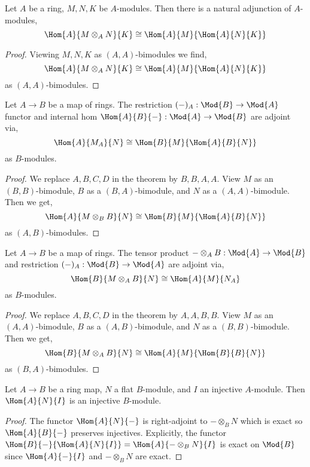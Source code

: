 \documentclass[12pt]{article}
\begin{document}
\begin{cor}
Let $A$ be a ring, $M, N, K$ be $A$-modules. Then there is a natural adjunction of $A$-modules,
\[ \Hom{A}{M \otimes_A N}{K} \cong \Hom{A}{M}{\Hom{A}{N}{K}} \]
\end{cor}

\begin{proof}
Viewing $M, N, K$ as $(A, A)$-bimodules we find,
\[ \Hom{A}{M \otimes_A N}{K} \cong \Hom{A}{M}{\Hom{A}{N}{K}} \]
as $(A,A)$-bimodules.
\end{proof}

\begin{cor}
Let $A \to B$ be a map of rings. The restriction $(-)_A : \Mod{B} \to \Mod{A}$ functor and internal hom $\Hom{A}{B}{-} : \Mod{A} \to \Mod{B}$ are adjoint via,
\[ \Hom{A}{M_A}{N} \cong \Hom{B}{M}{\Hom{A}{B}{N}} \]
as $B$-modules.
\end{cor}

\begin{proof}
We replace $A,B,C,D$ in the theorem by $B, B, A, A$. View $M$ as an $(B, B)$-bimodule, $B$ as a $(B, A)$-bimodule, and $N$ as a $(A, A)$-bimodule. Then we get,
\[ \Hom{A}{M \otimes_B B}{N} \cong \Hom{B}{M}{\Hom{A}{B}{N}} \]
as $(A, B)$-bimodules.
\end{proof}


\begin{cor}
Let $A \to B$ be a map of rings. The tensor product $- \otimes_A B : \Mod{A} \to \Mod{B}$ and restriction $(-)_A : \Mod{B} \to \Mod{A}$ are adjoint via,
\[ \Hom{B}{M \otimes_A B}{N} \cong \Hom{A}{M}{N_A} \]
as $B$-modules.
\end{cor}

\begin{proof}
We replace $A, B, C, D$ in the theorem by $A, A, B, B$. View $M$ as an $(A, A)$-bimodule, $B$ as a $(A, B)$-bimodule, and $N$ as a $(B, B)$-bimodule. Then we get,
\[ \Hom{B}{M \otimes_A B}{N} \cong \Hom{A}{M}{\Hom{B}{B}{N}} \]
as $(B, A)$-bimodules.
\end{proof}

\begin{cor}
Let $A \to B$ be a ring map, $N$ a flat $B$-module, and $I$ an injective $A$-module. Then $\Hom{A}{N}{I}$ is an injective $B$-module.
\end{cor}

\begin{proof}
The functor $\Hom{A}{N}{-}$ is right-adjoint to $- \otimes_B N$ which is exact so $\Hom{A}{B}{-}$ preserves injectives. Explicitly,
the functor $\Hom{B}{-}{\Hom{A}{N}{I}} = \Hom{A}{- \otimes_B N}{I}$ is exact on $\Mod{B}$ since $\Hom{A}{-}{I}$ and $- \otimes_B N$ are exact. 
\end{proof}
\end{document}
